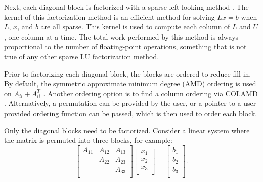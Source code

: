 \documentclass[11pt]{article}
\begin{document}
Next, each diagonal block is factorized with a sparse left-looking method
\cite{GilbertPeierls88}.  The kernel of this factorization method is an
efficient method for solving $Lx=b$ when $L$, $x$, and $b$ are all sparse.
This kernel is used to compute each column of $L$ and $U$, one column at a time.
The total work performed by this method is always proportional to the number of
floating-point operations, something that is not true of any other sparse LU
factorization method.

Prior to factorizing each diagonal block, the blocks are ordered to reduce
fill-in.  By default, the symmetric approximate minimum degree (AMD) ordering
is used on $A_{ii}+A_{ii}^T$ \cite{AmestoyDavisDuff96,AmestoyDavisDuff03}.
Another ordering option is to find a column ordering via COLAMD
\cite{DavisGilbertLarimoreNg00_algo,DavisGilbertLarimoreNg00}.
Alternatively, a permutation can be provided by the user, or a pointer to
a user-provided ordering function can be passed, which is then used to order
each block.

Only the diagonal blocks need to be factorized.  Consider a linear system where
the matrix is permuted into three blocks, for example:
\[
\left[
\begin{array}{ccc}
A_{11} & A_{12} & A_{13} \\
       & A_{22} & A_{23} \\
       &        & A_{33} \\
\end{array}
\right]
\left[
\begin{array}{c}
x_{1} \\
x_{2} \\
x_{3} \\
\end{array}
\right]
=
\left[
\begin{array}{c}
b_{1} \\
b_{2} \\
b_{3} \\
\end{array}
\right].
\]
\end{document}
